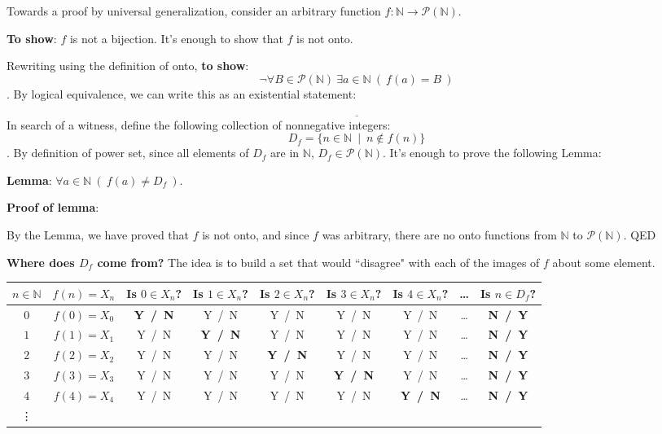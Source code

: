 \documentclass[12pt, oneside]{article}
\begin{document}


Towards a proof by  universal generalization,  consider  an arbitrary function $f:  \mathbb{N} \to\mathcal{P}(\mathbb{N})$.

{\bf To show}: $f$ is not a bijection.  It's enough to show that $f$ is not onto.

Rewriting using the definition of  onto, {\bf to show}:
\[
\neg  \forall  B \in  \mathcal{P}(\mathbb{N}) ~\exists a \in \mathbb{N}  ~(~f(a) =  B~)
\]
. By logical  equivalence, we can write this as an existential statement:
\[
\underline{\phantom{\qquad\qquad\exists B \in  \mathcal{P}(\mathbb{N}) ~\forall a \in \mathbb{N}  ~(~f(a) \neq  B~)\qquad\qquad}}
\]
In search of a witness, define the following  collection of nonnegative integers:
\[
D_f = \{ n \in \mathbb{N}  ~\mid~  n \notin f(n)  \}
\]
. By  definition  of power  set, since  all elements  of  $D_f$ are  in  $\mathbb{N}$,   $D_f \in \mathcal{P}(\mathbb{N})$.  It's enough to prove the following Lemma: 

{\bf Lemma}: $\forall a \in \mathbb{N}  ~(~f(a) \neq  D_f~)$.


{\bf Proof  of lemma}: \\

\vspace{50pt}

By  the Lemma, we  have proved that $f$ is not onto, and since $f$ was arbitrary, there are no onto
functions from $\mathbb{N}$ to $\mathcal{P}(\mathbb{N})$. QED


{\bf Where does $D_f$ come from?} The idea is to build a set that would ``disagree" with 
each of the images of $f$ about some element. 

\begin{center}
\begin{tabular}{c|c|ccccccc}
$n \in \mathbb{N}$ & $f(n) = X_n$ &  Is $0   \in X_n$?   & Is $1 \in X_n$?  &  Is $2 \in X_n$?  &  Is $3 \in X_n$?  &
 Is $4 \in X_n$?  &  \ldots & Is $n \in D_f$?\\
\hline
$0$ & $f(0) = X_0$ & {\bf  Y~/~N}  & Y~/~N & Y~/~N & Y~/~N &Y~/~N & \ldots & {\bf  N~/~Y }\\
$1$ & $f(1) = X_1$ & Y~/~N  & {\bf  Y~/~N} & Y~/~N & Y~/~N & Y~/~N & \ldots & {\bf  N~/~Y }\\
$2$ & $f(2) = X_2$ & Y~/~N  & Y~/~N & {\bf  Y~/~N} & Y~/~N &Y~/~N & \ldots & {\bf  N~/~Y }\\
$3$ & $f(3) = X_3$ & Y~/~N  & Y~/~N & Y~/~N & {\bf  Y~/~N} & Y~/~N & \ldots & {\bf  N~/~Y }\\
$4$ & $f(4) = X_4$ & Y~/~N  & Y~/~N & Y~/~N & Y~/~N &{\bf  Y~/~N} & \ldots & {\bf  N~/~Y }\\
\vdots
\end{tabular}
\end{center} \vfill
\end{document}
